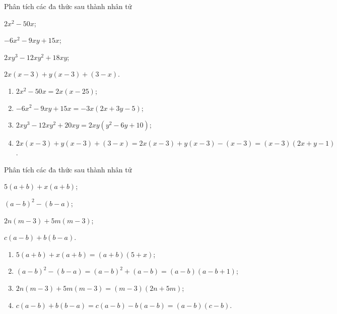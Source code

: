 \btvn

\begin{vn} Phân tích các đa thức sau thành nhân tử
	\begin{listEX}[2]
			\item $2x^2-50x$;
		\item $-6x^2 -9xy +15x$;
			\item $2xy^3-12xy^2+18xy$;
		\item $2x(x-3)+y(x-3)+(3-x)$.
	\end{listEX}
	\loigiai
	{
		\begin{enumerate}
				\item $2x^2-50x=2x(x-25)$;
					\item $-6x^2 -9xy +15x=-3x(2x+3y-5)$;
				\item $2xy^3-12xy^2+20xy=2xy(y^2-6y+10)$;	
				\item $2x(x-3)+y(x-3)+(3-x)=2x(x-3)+y(x-3)-(x-3)=(x-3)(2x+y-1)$.	
		\end{enumerate}
	}
\end{vn}

\begin{vn} 
	Phân tích các đa thức sau thành nhân tử
	\begin{listEX}[2]
		\item $5(a+b)+x(a+b)$;
		\item $(a-b)^2-(b-a)$;
		\item $2n(m-3)+5m(m-3)$;
		\item $c(a-b)+b(b-a)$.
		\end{listEX}
		\loigiai
		{
			\begin{enumerate}
			\item $5(a+b)+x(a+b)=(a+b)(5+x)$;
			\item $(a-b)^2-(b-a)=(a-b)^2+(a-b)=(a-b)(a-b+1)$;
			\item $2n(m-3)+5m(m-3)=(m-3)(2n+5m)$;
			\item $c(a-b)+b(b-a)=c(a-b)-b(a-b)=(a-b)(c-b)$.
			\end{enumerate}
		}
		\end{vn}
	
